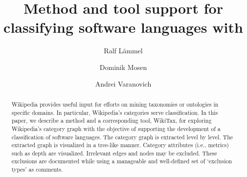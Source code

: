 \documentclass[a4paper,runningheads]{llncs}
\author{Ralf L\"ammel \and Dominik Mosen \and Andrei Varanovich}
\institute{University of Koblenz-Landau, Software Languages Team}
\title{Method and tool support for classifying software languages with \Wikipedia}
\newcommand{\Wikipedia}{\textsf{Wikipedia}}
\newcommand{\WikiTax}{\textsf{WikiTax}}
\begin{document}
\maketitle

\begin{abstract} 

  \Wikipedia{} provides useful input for efforts on mining taxonomies
  or ontologies in specific domains. In particular, \Wikipedia's
  categories serve classification. In this paper, we describe a
  method and a corresponding tool, \WikiTax, for exploring
  \Wikipedia's category graph with the objective of supporting the
  development of a classification of software languages. The category
  graph is extracted level by level. The extracted graph is visualized
  in a tree-like manner. Category attributes (i.e., metrics) such as
  depth are visualized. Irrelevant edges and nodes may be
  excluded. These exclusions are documented while using a manageable
  and well-defined set of `exclusion types' as comments.
\end{abstract}











\end{document}
